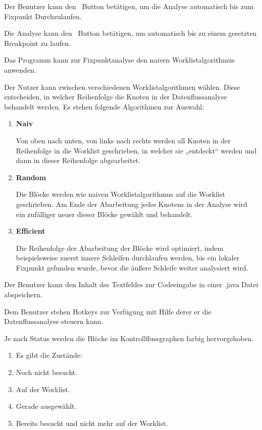 Der Benutzer kann den \faPlay\ Button betätigen, um die Analyse automatisch bis zum Fixpunkt Durchzulaufen.

Die Analyse kann den \faPlay\ Button betätigen, um automatisch bis zu einem gesetzten Breakpoint zu laufen.

Das Programm kann zur Fixpunktanalyse den naiven Worklistalgorithmus anwenden.

Der Nutzer kann zwischen verschiedenen Worklistalgorithmen wählen. Diese
entscheiden, in welcher Reihenfolge die Knoten in der Datenflussanalyse behandelt
werden. Es stehen folgende Algorithmen zur Auswahl:
\begin{enumerate}[label=(\alph*)]
\item \textbf{Naiv} \par
Von oben nach unten, von links nach rechts werden all Knoten in der Reihenfolge in
die Worklist geschrieben, in welcher sie „entdeckt“ werden und dann in dieser
Reihenfolge abgearbeitet.
\item \textbf{Random} \par
Die Blöcke werden wie naiven Worklistalgorithmus auf die Worklist geschrieben. Am Ende der Abarbeitung jedes Knotens in der Analyse wird ein
zufälliger neuer dieser Blöcke gewählt und behandelt.
\item \textbf{Efficient} \par
Die Reihenfolge der Abarbeitung der Blöcke wird optimiert, indem beispielsweise
zuerst innere Schleifen durchlaufen werden, bis ein lokaler Fixpunkt gefunden wurde, bevor die äußere Schleife weiter analysiert wird.
\end{enumerate}

Der Benutzer kann den Inhalt des Textfeldes zur Codeeingabe in einer .java Datei abspeichern.

Dem Benutzer stehen Hotkeys zur Verfügung mit Hilfe derer er die Datenflussanalyse steuern kann.

Je nach Status werden die Blöcke im Kontrollflussgraphen farbig hervorgehoben.
\begin{enumerate}[label=(\alph*)]
\item Es gibt die Zustände:
\item Noch nicht besucht.
\item Auf der Worklist.
\item Gerade ausgewählt.
\item Bereits besucht und nicht mehr auf der Worklist.
\end{enumerate}

